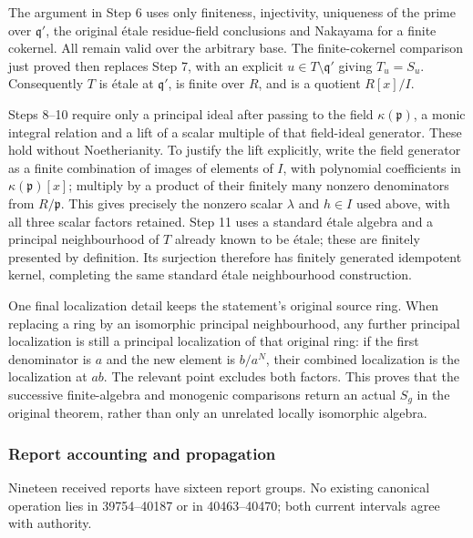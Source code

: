 The argument in Step 6 uses only finiteness, injectivity, uniqueness of the prime over \(\mathfrak q'\), the original étale residue-field conclusions and Nakayama for a finite cokernel. All remain valid over the arbitrary base. The finite-cokernel comparison just proved then replaces Step 7, with an explicit \(u\in T\setminus\mathfrak q'\) giving \(T_u=S_u\). Consequently \(T\) is étale at \(\mathfrak q'\), is finite over \(R\), and is a quotient \(R[x]/I\).

Steps 8--10 require only a principal ideal after passing to the field \(\kappa(\mathfrak p)\), a monic integral relation and a lift of a scalar multiple of that field-ideal generator. These hold without Noetherianity. To justify the lift explicitly, write the field generator as a finite combination of images of elements of \(I\), with polynomial coefficients in \(\kappa(\mathfrak p)[x]\); multiply by a product of their finitely many nonzero denominators from \(R/\mathfrak p\). This gives precisely the nonzero scalar \(\lambda\) and \(h\in I\) used above, with all three scalar factors retained. Step 11 uses a standard étale algebra and a principal neighbourhood of \(T\) already known to be étale; these are finitely presented by definition. Its surjection therefore has finitely generated idempotent kernel, completing the same standard étale neighbourhood construction.

One final localization detail keeps the statement's original source ring. When replacing a ring by an isomorphic principal neighbourhood, any further principal localization is still a principal localization of that original ring: if the first denominator is \(a\) and the new element is \(b/a^N\), their combined localization is the localization at \(ab\). The relevant point excludes both factors. This proves that the successive finite-algebra and monogenic comparisons return an actual \(S_g\) in the original theorem, rather than only an unrelated locally isomorphic algebra.

\subsubsection{Report accounting and propagation}\label{report-accounting-and-propagation}

Nineteen received reports have sixteen report groups. No existing canonical operation lies in 39754--40187 or in 40463--40470; both current intervals agree with authority.

